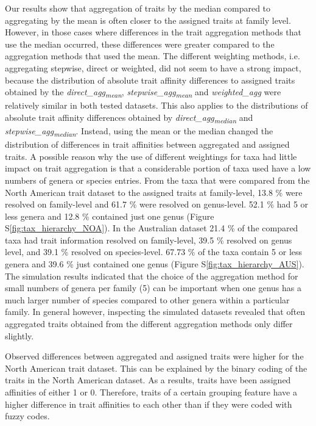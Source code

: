 \documentclass{article}
\begin{document}
Our results show that aggregation of traits by the median compared to aggregating by the mean is often closer to the assigned traits at family level. However, in those cases where differences in the trait aggregation methods that use the median occurred, these differences were greater compared to the aggregation methods that used the mean. The different weighting methods, i.e. aggregating stepwise, direct or weighted, did not seem to have a strong impact, because the distribution of absolute trait affinity differences to assigned traits obtained by the \textit{direct\_agg\textsubscript{mean}}, \textit{stepwise\_agg\textsubscript{mean}} and \textit{weighted\_agg} were relatively similar in both tested datasets. This also applies to the distributions of absolute trait affinity differences obtained by \textit{direct\_agg\textsubscript{median}} and \textit{stepwise\_agg\textsubscript{median}}. Instead, using the mean or the median changed the distribution of differences in trait affinities between aggregated and assigned traits. A possible reason why the use of different weightings for taxa had little impact on trait aggregation is that a considerable portion of taxa used have a low numbers of genera or species entries. From the taxa that were compared from the North American trait dataset to the assigned traits at family-level, 13.8 \% were resolved on family-level and 61.7 \% were resolved on genus-level. 52.1 \% had 5 or less genera and 12.8 \% contained just one genus (Figure S\ref{fig:tax_hierarchy_NOA}). In the Australian dataset 21.4 \% of the compared taxa had trait information resolved on family-level, 39.5 \% resolved on genus level, and 39.1 \% resolved on species-level. 67.73 \% of the taxa contain 5 or less genera and 39.6 \% just contained one genus (Figure S\ref{fig:tax_hierarchy_AUS}). The simulation results indicated that the choice of the aggregation method for small numbers of genera per family (5) can be important when one genus has a much larger number of species compared to other genera within a particular family. %
In general however, inspecting the simulated datasets revealed that often aggregated traits obtained from the different aggregation methods only differ slightly.

Observed differences between aggregated and assigned traits were higher for the North American trait dataset. This can be explained by the binary coding of the traits in the North American dataset. As a results, traits have been assigned affinities of either 1 or 0.  Therefore, traits of a certain grouping feature have a higher difference in trait affinities to each other than if they were coded with fuzzy codes.
\end{document}
